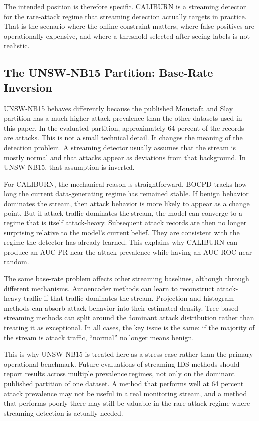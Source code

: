 \documentclass[preprint,12pt,authoryear]{elsarticle}
\newcommand{\caliburn}{CALIBURN}
\begin{document}
The intended position is therefore specific. \caliburn{} is a streaming detector for the rare-attack regime that streaming detection actually targets in practice. That is the scenario where the online constraint matters, where false positives are operationally expensive, and where a threshold selected after seeing labels is not realistic.

\subsection{The UNSW-NB15 Partition: Base-Rate Inversion}
\label{sec:disc-unsw}

UNSW-NB15 behaves differently because the published Moustafa and Slay partition has a much higher attack prevalence than the other datasets used in this paper. In the evaluated partition, approximately 64 percent of the records are attacks. This is not a small technical detail. It changes the meaning of the detection problem. A streaming detector usually assumes that the stream is mostly normal and that attacks appear as deviations from that background. In UNSW-NB15, that assumption is inverted.

For \caliburn{}, the mechanical reason is straightforward. BOCPD tracks how long the current data-generating regime has remained stable. If benign behavior dominates the stream, then attack behavior is more likely to appear as a change point. But if attack traffic dominates the stream, the model can converge to a regime that is itself attack-heavy. Subsequent attack records are then no longer surprising relative to the model's current belief. They are consistent with the regime the detector has already learned. This explains why \caliburn{} can produce an AUC-PR near the attack prevalence while having an AUC-ROC near random.

The same base-rate problem affects other streaming baselines, although through different mechanisms. Autoencoder methods can learn to reconstruct attack-heavy traffic if that traffic dominates the stream. Projection and histogram methods can absorb attack behavior into their estimated density. Tree-based streaming methods can split around the dominant attack distribution rather than treating it as exceptional. In all cases, the key issue is the same: if the majority of the stream is attack traffic, ``normal'' no longer means benign.

This is why UNSW-NB15 is treated here as a stress case rather than the primary operational benchmark. Future evaluations of streaming IDS methods should report results across multiple prevalence regimes, not only on the dominant published partition of one dataset. A method that performs well at 64 percent attack prevalence may not be useful in a real monitoring stream, and a method that performs poorly there may still be valuable in the rare-attack regime where streaming detection is actually needed.
\end{document}
